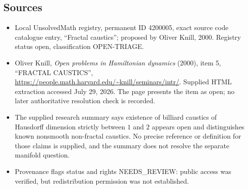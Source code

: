\documentclass[11pt]{article}
\begin{document}
\subsection{Sources}
\begin{itemize}
\item Local UnsolvedMath registry, permanent ID 4200005, exact source code catalogue entry, ``Fractal caustics''; proposed by Oliver Knill, 2000. Registry status open, classification OPEN-TRIAGE.
\item Oliver Knill, \emph{Open problems in Hamiltonian dynamics} (2000), item 5, ``FRACTAL CAUSTICS'', \url{https://people.math.harvard.edu/~knill/seminars/intr/}. Supplied HTML extraction accessed July 29, 2026. The page presents the item as open; no later authoritative resolution check is recorded.
\item The supplied research summary says existence of billiard caustics of Hausdorff dimension strictly between $1$ and $2$ appears open and distinguishes known nonsmooth non-fractal caustics. No precise reference or definition for those claims is supplied, and the summary does not resolve the separate manifold question.
\item Provenance flags status and rights NEEDS\_REVIEW: public access was verified, but redistribution permission was not established.
\end{itemize}
\end{document}
